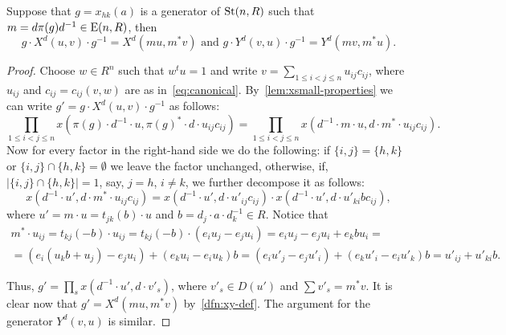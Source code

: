 \begin{lemma}
    \label{lem:xy-conj} Suppose that $g = x_{hk}(a)$ is a generator of $\operatorname{St}(n, R)$ such that $m = d\pi(g)d^{-1} \in \operatorname{E}(n, R)$, then
    \begin{equation*}
        g \cdot X^d(u, v) \cdot g^{-1} = X^d(mu, m^*v) \text{ and } g \cdot Y^d(v, u) \cdot g^{-1} = Y^d(mv, m^*u).
    \end{equation*}
\end{lemma}
\begin{proof}
 Choose $w\in R^n$ such that $w^t u = 1$ and write $v = \sum_{1\leq i<j\leq n} u_{ij} c_{ij}$, where $u_{ij}$ and $c_{ij} = c_{ij}(v, w)$ are as in~\eqref{eq:canonical}.
 By~\cref{lem:xsmall-properties} we can write $g' = g \cdot X^d(u, v) \cdot g^{-1}$ as follows:
 \begin{equation} \nonumber
   \prod\limits_{1\leq i<j\leq n} x(\pi(g) \cdot d^{-1} \cdot u, \pi(g)^* \cdot d \cdot u_{ij}c_{ij})
 = \prod\limits_{1\leq i<j\leq n} x( d^{-1} \cdot m \cdot u, d \cdot m^* \cdot u_{ij}c_{ij}).
 \end{equation}
 Now for every factor in the right-hand side we do the following:
 if $\{i, j\} = \{h, k\}$ or $\{i, j\} \cap \{h, k\} = \emptyset$ we leave the factor unchanged,
 otherwise, if, $|\{i, j\} \cap \{h, k\}| = 1$, say, $j = h$, $i\neq k$, we further decompose it as follows:
  \begin{equation} \nonumber
     x(d^{-1} \cdot u', d \cdot m^* \cdot u_{ij} c_{ij}) =
     x(d^{-1} \cdot u', d \cdot u'_{ij} c_{ij}) \cdot
     x(d^{-1} \cdot u', d \cdot u'_{ki} bc_{ij}),
  \end{equation}
 where $u' = m \cdot u = t_{jk}(b) \cdot u$ and $b = d_j \cdot a \cdot d_k^{-1} \in R$.
  Notice that
 \begin{multline*}
    m^* \cdot u_{ij} = t_{kj}(-b) \cdot u_{ij} = t_{kj}(-b) \cdot (e_i u_j-e_j u_i) = e_iu_j - e_ju_i + e_k b u_i =
     \\ = \left(e_i (u_kb + u_j) - e_j u_i\right) + (e_k u_i-e_i u_k)b = (e_i u'_j-e_j u'_i) + (e_k u'_i-e_i u'_k)b = u'_{ij}+u'_{ki}b.
 \end{multline*}

  Thus, $g' = \prod_{s} x(d^{-1} \cdot u', d \cdot v'_s) $, where $v'_s \in D(u')$ and $\sum v'_s = m^*v$.
  It is clear now that $g' = X^d(m u, m^* v)$ by~\cref{dfn:xy-def}.
  The argument for the generator $Y^d(v, u)$ is similar.
\end{proof}
